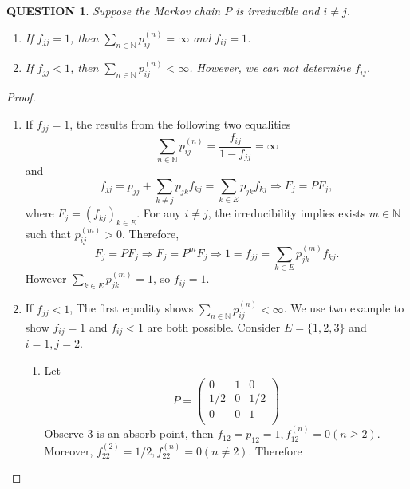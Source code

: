 \documentclass[12pt]{article}
\renewcommand{\(}{\left(}%
\renewcommand{\)}{\right)}%
\renewcommand{\[}{\left[}%
\renewcommand{\]}{\right]}%
\newcommand{\n}{\mathbb{N}}
\newtheorem{question}{QUESTION}[section]}
\newtheorem{proof}{Proof.}}
\begin{document}
   \begin{question}
   	Suppose the Markov chain $P$ is irreducible and $i\neq j$.
   	\begin{enumerate}
   		\item If $f_{jj}=1$, then $\sum_{n\in\n}p_{ij}^{(n)}=\infty$ and $f_{ij}=1$.
   		\item If $f_{jj}<1$, then $\sum_{n\in\n}p_{ij}^{(n)}<\infty$. However, we can not determine $f_{ij}$.
   	\end{enumerate} 
   \end{question}
   \begin{proof}
   	\begin{enumerate}
   		\item If $f_{jj}=1$, the results from the following two equalities 
   		\begin{equation*}
   			\sum_{n\in\n}p_{ij}^{(n)}=\frac{f_{ij}}{1-f_{jj}}=\infty
   		\end{equation*}
   		and 
   		\begin{equation*}
   			f_{jj}=p_{jj}+\sum_{k\neq j}p_{jk}f_{kj}=\sum_{k\in E}p_{jk}f_{kj}\Longrightarrow F_j=PF_j,
   		\end{equation*}
   		where $F_j=(f_{kj})_{k\in E}$. For any $i\neq j$, the irreducibility implies exists $m\in \n$ such that $p_{ij}^{(m)}>0$. Therefore, 
   		\begin{equation*}
   			F_j=PF_j\Longrightarrow F_j=P^mF_j\Longrightarrow 1=f_{jj}=\sum_{k\in E}p_{jk}^{(m)}f_{kj}.
   		\end{equation*}
   		However $\sum_{k\in E}p_{jk}^{(m)}=1$, so $f_{ij}=1$.
   		\item If $f_{jj}<1$, The first equality shows $\sum_{n\in\n}p_{ij}^{(n)}<\infty$. We use two example to show $f_{ij}=1$ and $f_{ij}<1$ are both possible. Consider $E=\{1,2,3\}$ and $i=1,j=2$.
   		\begin{enumerate}
   		 	\item  Let 
   		 	\begin{equation*}
   		 		P=
   		 		\begin{pmatrix}
   		 			0 & 1 & 0\\
   		 			1/2 & 0 & 1/2\\
   		 			0 & 0 & 1\\
   		 		\end{pmatrix}
   		 	\end{equation*}
   		 	Observe $3$ is an absorb point, then $f_{12}=p_{12}=1,f_{12}^{(n)}=0(n\geq 2)$. Moreover, $f^{(2)}_{22}=1/2, f_{22}^{(n)}=0(n\neq 2)$. Therefore

\end{enumerate}
\end{enumerate}
\end{proof}
\end{document}
